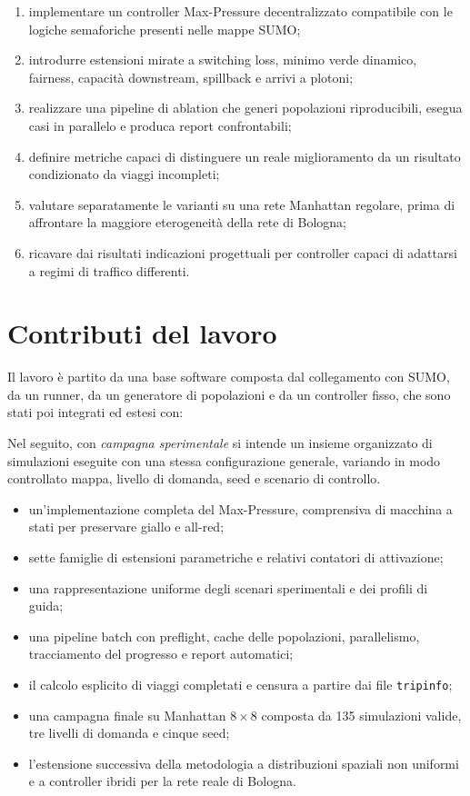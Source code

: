 \documentclass[12pt,a4paper,oneside]{report}
\numberwithin{equation}{chapter}
\begin{document}
\begin{enumerate}
    \item implementare un controller Max-Pressure decentralizzato compatibile
    con le logiche semaforiche presenti nelle mappe SUMO;
    \item introdurre estensioni mirate a switching loss, minimo verde dinamico,
    fairness, capacità downstream, spillback e arrivi a plotoni;
    \item realizzare una pipeline di ablation che generi popolazioni
    riproducibili, esegua casi in parallelo e produca report confrontabili;
    \item definire metriche capaci di distinguere un reale miglioramento da un
    risultato condizionato da viaggi incompleti;
    \item valutare separatamente le varianti su una rete Manhattan regolare,
    prima di affrontare la maggiore eterogeneità della rete di Bologna;
    \item ricavare dai risultati indicazioni progettuali per controller capaci
    di adattarsi a regimi di traffico differenti.
\end{enumerate}

\section{Contributi del lavoro}

Il lavoro è partito da una base software composta dal collegamento con SUMO, da
un runner, da un generatore di popolazioni e da un controller fisso, che sono
stati poi integrati ed estesi con:

Nel seguito, con \emph{campagna sperimentale} si intende un insieme organizzato
di simulazioni eseguite con una stessa configurazione generale, variando in modo
controllato mappa, livello di domanda, seed e scenario di controllo.

\begin{itemize}
    \item un'implementazione completa del Max-Pressure, comprensiva di macchina
    a stati per preservare giallo e all-red;
    \item sette famiglie di estensioni parametriche e relativi contatori di
    attivazione;
    \item una rappresentazione uniforme degli scenari sperimentali e dei
    profili di guida;
    \item una pipeline batch con preflight, cache delle popolazioni,
    parallelismo, tracciamento del progresso e report automatici;
    \item il calcolo esplicito di viaggi completati e censura a partire dai file
    \texttt{tripinfo};
    \item una campagna finale su Manhattan $8\times8$ composta da 135
    simulazioni valide, tre livelli di domanda e cinque seed;
    \item l'estensione successiva della metodologia a distribuzioni spaziali
    non uniformi e a controller ibridi per la rete reale di Bologna.
\end{itemize}
\end{document}

